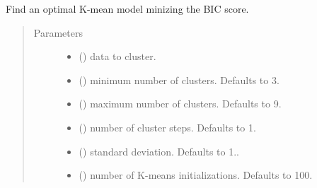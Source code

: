 \documentclass[letterpaper,10pt,english]{sphinxmanual}
\begin{document}
\begin{fulllineitems}
\label{\detokenize{_modules/cosifer.utils:cosifer.utils.vector_quantization.k_means_optimized_with_bic}}
Find an optimal K-mean model minizing the BIC score.
\begin{quote}\begin{description}
\item[{Parameters}] \leavevmode\begin{itemize}
\item {} 
 () \textendash{} data to cluster.

\item {} 
 (\sphinxstyleliteralemphasis{\sphinxupquote{, }}) \textendash{} minimum number of clusters. Defaults to 3.

\item {} 
 (\sphinxstyleliteralemphasis{\sphinxupquote{, }}) \textendash{} maximum number of clusters. Defaults to 9.

\item {} 
 (\sphinxstyleliteralemphasis{\sphinxupquote{, }}) \textendash{} number of cluster steps. Defaults to 1.

\item {} 
 (\sphinxstyleliteralemphasis{\sphinxupquote{, }}) \textendash{} standard deviation. Defaults to 1..

\item {} 
 (\sphinxstyleliteralemphasis{\sphinxupquote{, }}) \textendash{} number of K-means initializations.
Defaults to 100.


\end{itemize}
\end{description}
\end{quote}
\end{fulllineitems}
\end{document}
